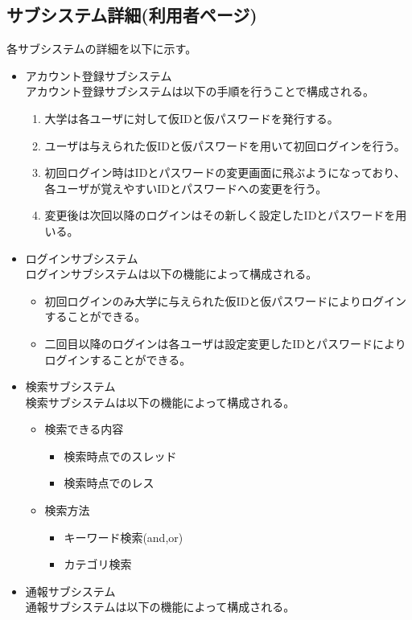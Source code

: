 \documentclass[a4j]{jarticle}
\begin{document}
\subsection{サブシステム詳細(利用者ページ)}
各サブシステムの詳細を以下に示す。
\begin{itemize}
\item アカウント登録サブシステム\\
アカウント登録サブシステムは以下の手順を行うことで構成される。
\begin{enumerate}
\item 大学は各ユーザに対して仮IDと仮パスワードを発行する。
\item ユーザは与えられた仮IDと仮パスワードを用いて初回ログインを行う。
\item 初回ログイン時はIDとパスワードの変更画面に飛ぶようになっており、各ユーザが覚えやすいIDとパスワードへの変更を行う。
\item 変更後は次回以降のログインはその新しく設定したIDとパスワードを用いる。
\end{enumerate}

\item ログインサブシステム\\
ログインサブシステムは以下の機能によって構成される。
\begin{itemize}
\item 初回ログインのみ大学に与えられた仮IDと仮パスワードによりログインすることができる。
\item 二回目以降のログインは各ユーザは設定変更したIDとパスワードによりログインすることができる。
\end{itemize}

\item 検索サブシステム\\
検索サブシステムは以下の機能によって構成される。
\begin{itemize}
\item 検索できる内容
\begin{itemize}
\item 検索時点でのスレッド
\item 検索時点でのレス
\end{itemize}
\item 検索方法
\begin{itemize}
\item キーワード検索(and,or)
\item カテゴリ検索
\end{itemize}
\end{itemize}

\item 通報サブシステム\\
通報サブシステムは以下の機能によって構成される。


\end{itemize}
\end{document}
